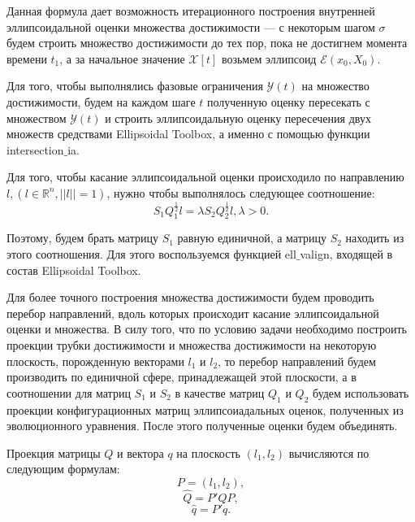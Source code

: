 \documentclass[12pt]{article}
\begin{document}
		Данная формула дает возможность итерационного построения внутренней эллипсоидальной оценки множества достижимости --- с некоторым шагом $\sigma$ будем строить множество достижимости до тех пор, пока не достигнем момента времени $t_1$, а за начальное значение $\mathcal{X}[t]$ возьмем эллипсоид $\mathcal{E}(x_0, X_0)$.	
		
		Для того, чтобы выполнялись фазовые ограничения $\mathcal{Y}(t)$ на множество достижимости, будем на каждом шаге $t$ полученную оценку пересекать с множеством $\mathcal{Y}(t)$ и строить эллипсоидальную оценку пересечения двух множеств средствами Ellipsoidal Toolbox, а именно с помощью функции intersection$\_$ia. 
		
		Для того, чтобы касание эллипсоидальной оценки происходило по направлению $l, (l \in \mathbb{R}^n, || l || = 1)$, нужно чтобы выполнялось следующее соотношение:
		$$
			S_1 Q_1^{\frac{1}{2}} l = \lambda S_2 Q_2^{\frac{1}{2}} l, \lambda > 0.
		$$
		
		Поэтому, будем брать матрицу $S_1$ равную единичной, а матрицу $S_2$ находить из этого соотношения. Для этого воспользуемся функцией ell$\_$valign, входящей в состав Ellipsoidal Toolbox.
		
		Для более точного построения множества достижимости будем проводить перебор направлений, вдоль которых происходит касание эллипсоидальной оценки и множества. В силу того, что по условию задачи необходимо построить проекции трубки достижимости и множества достижимости на некоторую плоскость, порожденную векторами $l_1$ и $l_2$, то перебор направлений будем производить по единичной сфере, принадлежащей этой плоскости, а в соотношении для матриц $S_1$ и $S_2$ в качестве матриц $Q_1$ и $Q_2$ будем использовать проекции конфигурационных матриц эллипсоиадальных оценок, полученных из эволюционного уравнения. После этого полученные оценки будем объединять.
		
		Проекция матрицы $Q$ и вектора $q$ на плоскость $(l_1, l_2)$ вычисляются по следующим формулам:
		$$
			P = (l_1, l_2),
		$$
		$$
			\widehat{Q} = P' Q P,
		$$ 
		$$
			\widehat{q} = P' q.
		$$
							
        
        
\end{document}
